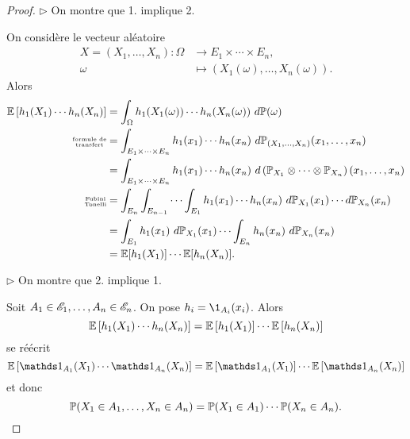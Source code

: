 \begin{proof}
    \(\triangleright\) On montre que 1. implique 2. 

    On considère le vecteur aléatoire 
    \begin{equation*}
        \begin{aligned}
            X = (X_1,\ldots,X_n): \Omega &\to E_1\times\cdots\times E_n,\\
            \omega &\mapsto (X_1(\omega),\ldots,X_n(\omega)).
        \end{aligned}
    \end{equation*}
    Alors
    \begin{equation*}
        \begin{aligned}
            \mathbb{E}\left[ h_1(X_1)\cdots h_n(X_n) \right]
            &= \int_{\Omega} h_1(X_1(\omega))\cdots h_n(X_n(\omega))\,\mathop{}\!{d} \mathbb{P}(\omega)\\
            \text{\scriptsize{\(\substack{\text{formule de}\\\text{transfert}}\)}}
            &= \int_{E_1\times\cdots\times E_n} h_1(x_1)\cdots h_n(x_n)\,\mathop{}\!{d} \mathbb{P}_{(X_1,\ldots,X_n)}(x_1,\ldots,x_n)\\
            &= \int_{E_1\times\cdots\times E_n} h_1(x_1)\cdots h_n(x_n)\,\mathop{}\!{d} \left( \mathbb{P}_{X_1}\otimes\cdots\otimes\mathbb{P}_{X_n} \right)(x_1,\ldots,x_n)\\
            \text{\scriptsize{\(\substack{\text{Fubini}\\\text{Tonelli}}\)}}
            &= \int_{E_n} \int_{E_{n-1}}\cdots \int_{E_1} h_1(x_1)\cdots h_n(x_n)\,\mathop{}\!{d} \mathbb{P}_{X_1}(x_1)\cdots \mathop{}\!{d} \mathbb{P}_{X_n}(x_n)\\
            &= \int_{E_1} h_1(x_1)\,\mathop{}\!{d} \mathbb{P}_{X_1}(x_1)\cdots \int_{E_n} h_n(x_n)\,\mathop{}\!{d} \mathbb{P}_{X_n}(x_n)\\
            &= \mathbb{E}[h_1(X_1)]\cdots \mathbb{E}[h_n(X_n)].
        \end{aligned}
    \end{equation*}

    \(\triangleright\) On montre que 2. implique 1.

    Soit \(A_1\in\mathscr{E}_1,\ldots,A_n\in\mathscr{E}_n\). On pose \(h_i = \1_{A_i}(x_i)\).
    Alors
    \begin{equation*}
        \mathbb{E}\left[ h_1(X_1)\cdots h_n(X_n) \right] = \mathbb{E}\left[ h_1(X_1)\right]\cdots \mathbb{E}\left[ h_n(X_n) \right]
    \end{equation*}
    se réécrit
    \begin{equation*}
        \bb E\left[ \one_{A_1}(X_1)\cdots \one_{A_n}(X_n) \right] = \bb E\left[ \one_{A_1}(X_1) \right]\cdots \bb E\left[ \one_{A_n}(X_n) \right]
    \end{equation*}
    et donc
    \begin{equation*}
        \mathbb{P}(X_1\in A_1,\ldots,X_n\in A_n) = \mathbb{P}(X_1\in A_1)\cdots \mathbb{P}(X_n\in A_n).
    \end{equation*}
\end{proof}

